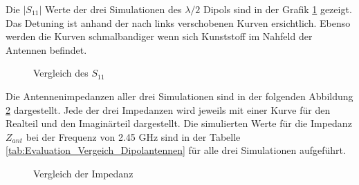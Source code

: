 Die $|S_{11}|$ Werte der drei Simulationen des $\lambda/2$ Dipols sind in der Grafik \ref{S11_Vergleich_Simulation} gezeigt. Das Detuning ist anhand der nach links verschobenen Kurven ersichtlich. Ebenso werden die Kurven schmalbandiger wenn sich Kunststoff im Nahfeld der Antennen befindet.

\begin{figure}[!ht]
	\centering
	\begingroup
	
	\endgroup
	\caption{Vergleich des $S_{11}$}
	\label{S11_Vergleich_Simulation}
\end{figure}
\newpage
Die Antennenimpedanzen aller drei Simulationen sind in der folgenden Abbildung \ref{Impedanz_Vergleich_Simulation} dargestellt. Jede der drei Impedanzen wird jeweils mit einer Kurve für den Realteil und den Imaginärteil dargestellt. Die simulierten Werte für die Impedanz $Z_{ant}$ bei der Frequenz von 2.45 GHz sind in der Tabelle \ref{tab:Evaluation_Vergeich_Dipolantennen} für alle drei Simulationen aufgeführt.
\begin{figure}[!ht]
	\centering
	\begingroup
	
	\endgroup
	\caption{Vergleich der Impedanz}
	\label{Impedanz_Vergleich_Simulation}
\end{figure}
\clearpage
\newpage
